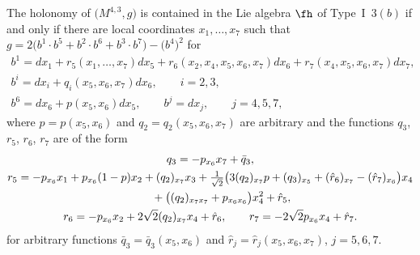 \begin{Proposition} The holonomy of $\big(M^{4,3},g\big)$ is contained in the Lie algebra $\fh$ of Type~I~$3(b)$ if and only if there are local coordinates $x_1,\dots,x_7$ such that $g=2\big(b^1\cdot b^5+b^2\cdot b^6+b^3\cdot b^7\big)- \big(b^4\big)^2$ for
\begin{gather*}
b^1= dx_1 + r_5(x_1,\dots, x_7)dx_5+r_6(x_2,x_4,x_5, x_6,x_7)dx_6+r_7(x_4,x_5,x_6,x_7)dx_7, \\
b^i= dx_i+q_i(x_5,x_6,x_7)dx_6,\qquad i=2,3, \\
b^6= dx_6 + p(x_5,x_6) dx_5 ,\qquad
b^j= dx_j,\qquad j=4,5,7,
\end{gather*}
where
$p=p(x_5,x_6)$ and $q_2=q_2(x_5,x_6,x_7)$ are arbitrary and the functions $q_3$, $r_5$, $r_6$, $r_7$ are of the form
\begin{gather*}
q_3 = -p_{x_6}x_7+\bar q_3,\\
r_5 = -p_{x_6} x_1 +p_{x_6}(1-p)x_2 +(q_2)_{x_7}x_3+\tfrac1{\sqrt2}\big(3(q_2)_{x_7}p+(q_3)_{x_5}+(\hat r_6)_{x_7}-(\hat r_7)_{x_6}\big)x_4 \\
\hphantom{r_5 =}{} +\big((q_2)_{x_7 x_7}+p_{x_6 x_6}\big)x_4^2 +\hat r_5, \\
r_6 = -p_{x_6}x_2 +2\sqrt2 (q_2)_{x_7} x_4+\hat r_6,\qquad
r_7 = -2\sqrt2 p_{x_6}x_4 +\hat r_7.
\end{gather*}
for arbitrary functions $\bar q_3=\bar q_3(x_5,x_6)$ and $\hat r _j =\hat r_j(x_5,x_6,x_7)$, $j=5,6,7$.
\end{Proposition}

